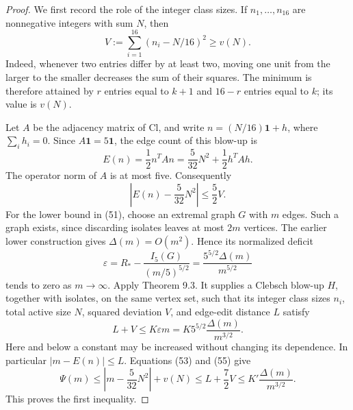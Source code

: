 \documentclass[11pt]{amsart}
\theoremstyle{definition}
\theoremstyle{remark}
\begin{document}
\begin{proof}
We first record the role of the integer class sizes. If
$n_1,\ldots,n_{16}$ are nonnegative integers with sum $N$, then
\begin{equation}\tag{53}\label{eq:53}
 V:=\sum_{i=1}^{16}(n_i-N/16)^2\geq v(N).
\end{equation}
Indeed, whenever two entries differ by at least two, moving one unit from
the larger to the smaller decreases the sum of their squares. The minimum
is therefore attained by $r$ entries equal to $k+1$ and $16-r$ entries equal
to $k$; its value is $v(N)$.

Let $A$ be the adjacency matrix of $\mathrm{Cl}$, and write
$n=(N/16)\mathbf1+h$, where $\sum_i h_i=0$. Since $A\mathbf1=5\mathbf1$,
the edge count of this blow-up is
\begin{equation}\tag{54}\label{eq:54}
 E(n)=\frac12n^TAn=\frac5{32}N^2+\frac12h^TAh.
\end{equation}
The operator norm of $A$ is at most five. Consequently
\begin{equation}\tag{55}\label{eq:55}
 \left|E(n)-\frac5{32}N^2\right|\leq\frac52 V.
\end{equation}
For the lower bound in (51), choose an extremal graph $G$ with $m$ edges.
Such a graph exists, since discarding isolates leaves at most $2m$ vertices.
The earlier lower construction gives $\Delta(m)=O(m^2)$. Hence its
normalized deficit
\[
 \varepsilon=R_\ast-\frac{I_5(G)}{(m/5)^{5/2}}
 =\frac{5^{5/2}\Delta(m)}{m^{5/2}}
\]
tends to zero as $m\to\infty$. Apply Theorem 9.3. It supplies a Clebsch
blow-up $H$, together with isolates, on the same vertex set, such that its
integer class sizes $n_i$, total active size $N$, squared deviation $V$, and
edge-edit distance $L$ satisfy
\[
 L+V\leq K\varepsilon m=K5^{5/2}\frac{\Delta(m)}{m^{3/2}}.
\]
Here and below a constant may be increased without changing its dependence.
In particular $|m-E(n)|\leq L$. Equations (53) and (55) give
\[
 \Psi(m)\leq\left|m-\frac5{32}N^2\right|+v(N)
 \leq L+\frac72V\leq K'\frac{\Delta(m)}{m^{3/2}}.
\]
This proves the first inequality.


\end{proof}
\end{document}
